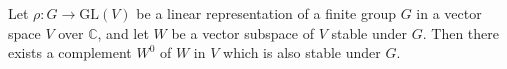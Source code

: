 Let $\rho: G \to \text{GL}(V)$ be a linear representation of a finite group $G$ in a vector space $V$ over $\mathbb{C}$, and let $W$ be a vector subspace of $V$ stable under $G$. Then there exists a complement $W^0$ of $W$ in $V$ which is also stable under $G$.
